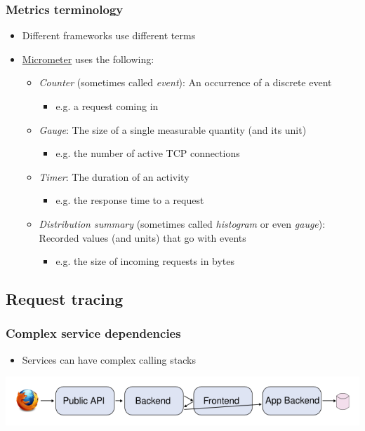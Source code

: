 \documentclass[8pt]{article}
\begin{document}
\subsubsection{Metrics terminology}
\label{sec:org704bb33}
\begin{itemize}
\item Different frameworks use different terms
\item \href{https://micrometer.io/}{Micrometer} uses the following:
\begin{itemize}
\item \emph{Counter} (sometimes called \emph{event}): An occurrence of a discrete event
\begin{itemize}
\item e.g. a request coming in
\end{itemize}
\item \emph{Gauge}: The size of a single measurable quantity (and its unit)
\begin{itemize}
\item e.g. the number of active TCP connections
\end{itemize}
\item \emph{Timer}: The duration of an activity
\begin{itemize}
\item e.g. the response time to a request
\end{itemize}
\item \emph{Distribution summary} (sometimes called \emph{histogram} or even \emph{gauge}): Recorded values (and units) that go with events
\begin{itemize}
\item e.g. the size of incoming requests in bytes
\end{itemize}
\end{itemize}
\end{itemize}
\subsection{Request tracing}
\label{sec:org9be8b8c}
\subsubsection{Complex service dependencies}
\label{sec:orgf64b956}
\begin{itemize}
\item Services can have complex calling stacks
\end{itemize}
\begin{center}
\includegraphics[width=.9\linewidth]{graphics/svg/tsflow.png}
\end{center}
\end{document}
